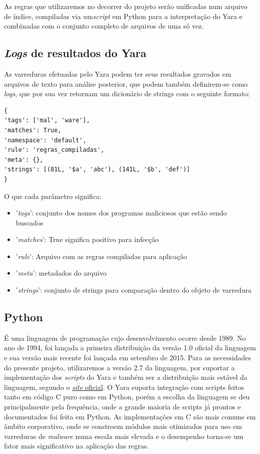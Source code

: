 As regras que utilizaremos no decorrer do projeto serão unificadas num arquivo de índice, compiladas via um\textit{script} em Python para a interpretação do Yara e combinadas com o conjunto completo de arquivos de uma só vez.

\subsection{\textit{Logs} de resultados do Yara} %
\label{sub:logs_de_resultados_do_yara}

As varreduras efetuadas pelo Yara podem ter seus resultados gravados em arquivos de texto para análise posterior, que podem também definirem-se como \textit{logs}, que por sua vez retornam um dicionário de strings com o seguinte formato:

\begin{lstlisting}[caption=Conteúdo dos arquivos de resultado de varredura, label=resultyara]
{
'tags': ['mal', 'ware'],
'matches': True,
'namespace': 'default',
'rule': 'regras_compiladas',
'meta': {},
'strings': [(81L, '$a', 'abc'), (141L, '$b', 'def')]
}
\end{lstlisting}

O que cada parâmetro significa:
\begin{itemize}
	\item '\textit{tags}': conjunto dos nomes dos programas maliciosos que estão sendo buscados

	\item '\textit{matches}': True significa positivo para infecção

	\item '\textit{rule}': Arquivo com as regras compiladas para aplicação

	\item '\textit{meta}': metadados do arquivo

	\item '\textit{strings}': conjunto de strings para comparação dentro do objeto de varredura
\end{itemize}

\subsection{Python}
\label{sub:python}

É uma linguagem de programação cujo desenvolvimento ocorre desde 1989. No ano
de 1994, foi lançada a primeira distribuição da versão 1.0 oficial da
linguagem e sua versão mais recente foi lançada em setembro de 2015. Para as
necessidades do presente projeto, utilizaremos a versão 2.7 da linguagem, por
suportar a implementação dos \textit{scripts} do Yara e também ser a distribuição mais
estável da linguagem, segundo o \href{www.python.org}{\textit{site} oficial}. O Yara suporta integração com scripts feitos tanto em código C puro como em Python, porém a escolha da linguagem se deu principalmente pela frequência, onde a grande maioria de scripts já prontos e documentados foi feita em Python. As implementações em C são mais comuns em âmbito corporativo, onde se constroem módulos mais otimizados para uso em varreduras de \textit{malware} numa escala mais elevada e o desempenho torna-se um fator mais significativo na aplicação das regras.

